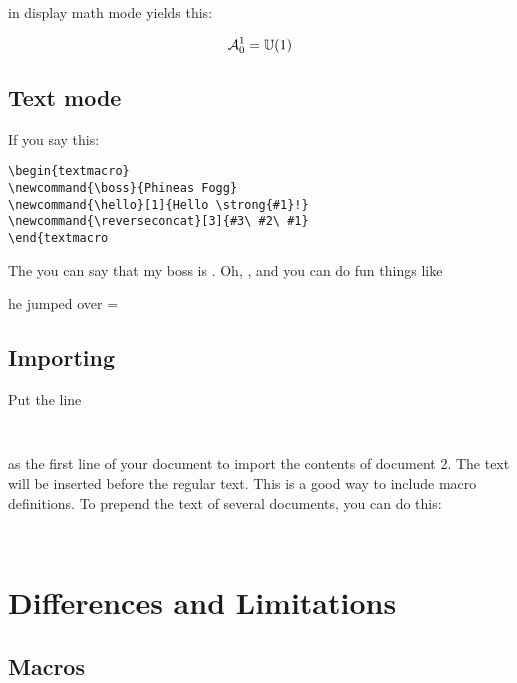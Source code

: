 in display math mode yields this:

$$
\mathcal{A}_0^1 = \mathbb{U}(1)
$$


\subsection{Text mode}

\begin{textmacro}
\newcommand{\boss}{Phineas Fogg}
\newcommand{\hello}[1]{Hello \strong{#1}!}
\newcommand{\reverseconcat}[3]{#3#2#1}
\end{textmacro}


If you say this:

\begin{verbatim}
\begin{textmacro}
\newcommand{\boss}{Phineas Fogg}
\newcommand{\hello}[1]{Hello \strong{#1}!}
\newcommand{\reverseconcat}[3]{#3\ #2\ #1}
\end{textmacro
\end{verbatim}

The you can say that my boss is \boss. Oh, , and you can do fun things like

\begin{center}
he jumped over = 
\end{center}

\subsection{Importing}

Put the line

\begin{verbatim}
  
\end{verbatim}

as the first line of your document to import the contents of document 2.  The text will be inserted before the regular text.  This is a good way to include macro definitions.  To prepend the text of several documents, you can do this:

\begin{verbatim}
  
\end{verbatim}

\section{Differences and Limitations}

\subsection{Macros}


